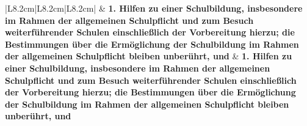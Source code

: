 \documentclass[10pt,a4paper,landscape]{article}
\begin{document}
\begin{longtable}{|L{8.2cm}|L{8.2cm}|L{8.2cm}|}
\hhline{|---|}
 & \textbf{1. Hilfen zu einer Schulbildung,  \newline insbesondere im Rahmen der  \newline allgemeinen Schulpflicht und zum  \newline Besuch weiterführender Schulen  \newline einschließlich der Vorbereitung hierzu;  \newline die Bestimmungen über die  \newline Ermöglichung der Schulbildung im  \newline Rahmen der allgemeinen Schulpflicht  \newline bleiben unberührt, und } & \textbf{1. Hilfen zu einer Schulbildung,  \newline insbesondere im Rahmen der  \newline allgemeinen Schulpflicht und zum  \newline Besuch weiterführender Schulen  \newline einschließlich der Vorbereitung hierzu;  \newline die Bestimmungen über die  \newline Ermöglichung der Schulbildung im  \newline Rahmen der allgemeinen Schulpflicht  \newline bleiben unberührt, und } \\
\hhline{|---|}

\end{longtable}
\end{document}
